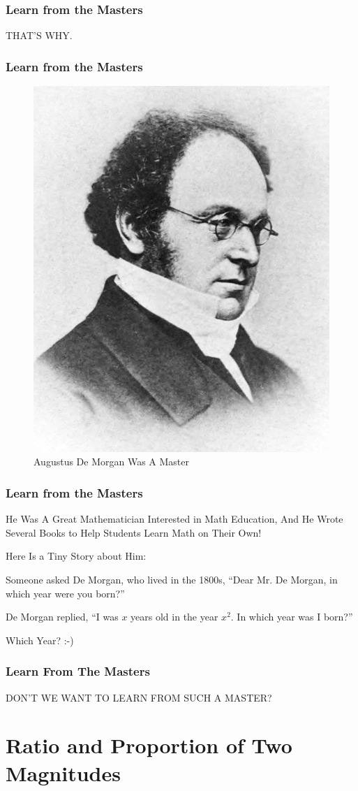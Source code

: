 \documentclass{beamer}
\begin{document}
\begin{frame}
\frametitle{Learn from the Masters}
THAT'S WHY.
\end{frame}

\begin{frame}
\frametitle{Learn from the Masters}
\begin{figure}[H]
\includegraphics[width=.345\textwidth]{images/de-morgan}
\caption{Augustus De Morgan Was A Master}
\label{fig:de-morgan}
\end{figure}
\end{frame}

\begin{frame}
\frametitle{Learn from the Masters}
He Was A Great Mathematician Interested in Math Education, And He Wrote Several Books to Help Students Learn Math on Their Own!

Here Is a Tiny Story about Him:
\pause

\hrulefill

{\small
Someone asked De Morgan, who lived in the 1800s, ``Dear Mr. De Morgan, in which year were you born?'' 

De Morgan replied, ``I was $x$ years old in the year $x^2$. In which year was I born?''
}

\hrulefill

\pause

Which Year? :-)

\end{frame}

\begin{frame}
\frametitle{Learn From The Masters}

DON'T WE WANT TO LEARN FROM SUCH A MASTER?
\end{frame}

\section{Ratio and Proportion of Two Magnitudes}
\end{document}
